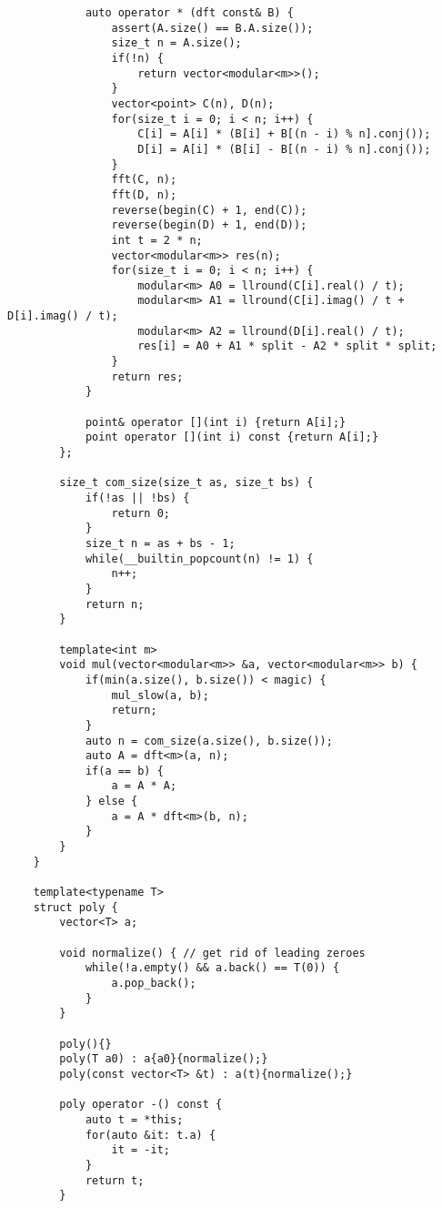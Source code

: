 \begin{lstlisting}
            auto operator * (dft const& B) {
                assert(A.size() == B.A.size());
                size_t n = A.size();
                if(!n) {
                    return vector<modular<m>>();
                }
                vector<point> C(n), D(n);
                for(size_t i = 0; i < n; i++) {
                    C[i] = A[i] * (B[i] + B[(n - i) % n].conj());
                    D[i] = A[i] * (B[i] - B[(n - i) % n].conj());
                }
                fft(C, n);
                fft(D, n);
                reverse(begin(C) + 1, end(C));
                reverse(begin(D) + 1, end(D));
                int t = 2 * n;
                vector<modular<m>> res(n);
                for(size_t i = 0; i < n; i++) {
                    modular<m> A0 = llround(C[i].real() / t);
                    modular<m> A1 = llround(C[i].imag() / t + D[i].imag() / t);
                    modular<m> A2 = llround(D[i].real() / t);
                    res[i] = A0 + A1 * split - A2 * split * split;
                }
                return res;
            }
            
            point& operator [](int i) {return A[i];}
            point operator [](int i) const {return A[i];}
        };
        
        size_t com_size(size_t as, size_t bs) {
            if(!as || !bs) {
                return 0;
            }
            size_t n = as + bs - 1;
            while(__builtin_popcount(n) != 1) {
                n++;
            }
            return n;
        }
        
        template<int m>
        void mul(vector<modular<m>> &a, vector<modular<m>> b) {
            if(min(a.size(), b.size()) < magic) {
                mul_slow(a, b);
                return;
            }
            auto n = com_size(a.size(), b.size());
            auto A = dft<m>(a, n);
            if(a == b) {
                a = A * A;
            } else {
                a = A * dft<m>(b, n);
            }
        }
    }

    template<typename T>
    struct poly {
        vector<T> a;
        
        void normalize() { // get rid of leading zeroes
            while(!a.empty() && a.back() == T(0)) {
                a.pop_back();
            }
        }
        
        poly(){}
        poly(T a0) : a{a0}{normalize();}
        poly(const vector<T> &t) : a(t){normalize();}
        
        poly operator -() const {
            auto t = *this;
            for(auto &it: t.a) {
                it = -it;
            }
            return t;
        }
        

\end{lstlisting}
